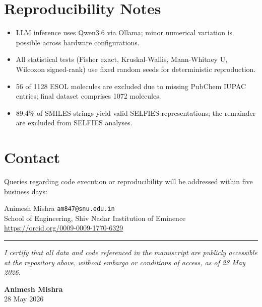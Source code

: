 \documentclass[12pt,a4paper]{article}
\begin{document}
\section*{Reproducibility Notes}

\begin{itemize}
  \item LLM inference uses Qwen3.6 via Ollama; minor numerical variation is possible across hardware configurations.
  \item All statistical tests (Fisher exact, Kruskal-Wallis, Mann-Whitney U, Wilcoxon signed-rank) use fixed random seeds for deterministic reproduction.
  \item 56 of 1128 ESOL molecules are excluded due to missing PubChem IUPAC entries; final dataset comprises 1072 molecules.
  \item 89.4\% of SMILES strings yield valid SELFIES representations; the remainder are excluded from SELFIES analyses.
\end{itemize}

\section*{Contact}

Queries regarding code execution or reproducibility will be addressed within five business days:

\begin{center}
  Animesh Mishra \quad \texttt{am847@snu.edu.in}\\
  School of Engineering, Shiv Nadar Institution of Eminence\\
  \url{https://orcid.org/0009-0009-1770-6329}
\end{center}

\vspace{2em}
\hrule
\vspace{1em}

\noindent\textit{I certify that all data and code referenced in the manuscript are publicly accessible at the repository above, without embargo or conditions of access, as of 28 May 2026.}

\vspace{1.5em}
\noindent\textbf{Animesh Mishra}\\
28 May 2026
\end{document}
